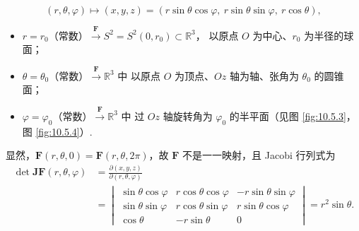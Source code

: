 \[
(r, \theta, \varphi) \mapsto (x, y, z) = (r \sin\theta \cos\varphi,\ r \sin\theta \sin\varphi,\ r \cos\theta),
\]
\begin{itemize}
  \item $r = r_0$（常数）$\xrightarrow{\boldsymbol{F}} S^2 = S^2(0, r_0) \subset \mathbb{R}^3$，
        以原点 $O$ 为中心、$r_0$ 为半径的球面；
  \item $\theta = \theta_0$（常数）$\xrightarrow{\boldsymbol{F}} \mathbb{R}^3$ 中
        以原点 $O$ 为顶点、$Oz$ 轴为轴、张角为 $\theta_0$ 的圆锥面；
  \item $\varphi = \varphi_0$（常数）$\xrightarrow{\boldsymbol{F}} \mathbb{R}^3$ 中
        过 $Oz$ 轴旋转角为 $\varphi_0$ 的半平面（见图 \ref{fig:10.5.3}，图 \ref{fig:10.5.4}）.
\end{itemize}
显然，$\boldsymbol{F}(r, \theta, 0) = \boldsymbol{F}(r, \theta, 2\pi)$，故 $\boldsymbol{F}$ 不是一一映射，且 Jacobi 行列式为
\[
\begin{aligned}
\det \boldsymbol{J}\boldsymbol{F}(r, \theta, \varphi)
&= \frac{\partial(x, y, z)}{\partial(r, \theta, \varphi)}\\
&= \begin{vmatrix}
  \sin\theta \cos\varphi & r\cos\theta \cos\varphi & -r\sin\theta \sin\varphi\\
  \sin\theta \sin\varphi & r\cos\theta \sin\varphi & r\sin\theta \cos\varphi\\
  \cos\theta & -r\sin\theta & 0
 \end{vmatrix}
 = r^2 \sin\theta.
\end{aligned}
\]

